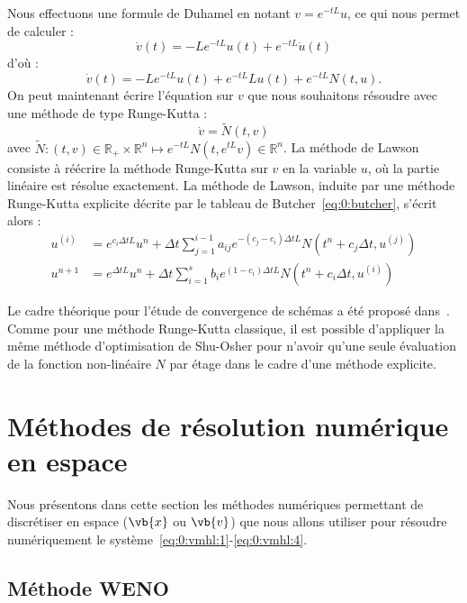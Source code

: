 Nous effectuons une formule de Duhamel en notant $v = e^{-tL}u$, ce qui nous permet de calculer :
$$
  \dot{v}(t) = -Le^{-tL}u(t) + e^{-tL}\dot{u}(t)
$$
d'où :
$$
  \dot{v}(t) = -Le^{-tL}u(t) + e^{-tL}Lu(t) + e^{-tL}N(t,u).
$$
On peut maintenant écrire l'équation sur $v$ que nous souhaitons résoudre avec une méthode de type Runge-Kutta :
$$
  \dot{v} = \tilde{N}(t,v)
$$
avec $\tilde{N}:(t,v)\in\mathbb{R}_+\times\mathbb{R}^n\mapsto e^{-tL}N(t,e^{tL}v)\in\mathbb{R}^n$. La méthode de Lawson consiste à réécrire la méthode Runge-Kutta sur $v$ en la variable $u$, où la partie linéaire est résolue exactement. La méthode de Lawson, induite par une méthode Runge-Kutta explicite décrite par le tableau de Butcher~\eqref{eq:0:butcher}, s'écrit alors :
$$
  \begin{aligned}
    u^{(i)} &= e^{c_i\Delta t L}u^n + \Delta t \sum_{j=1}^{i-1} a_{ij}e^{-(c_j-c_i)\Delta t L}N(t^n+c_j\Delta t,u^{(j)}) \\
    u^{n+1} &= e^{\Delta t L}u^n + \Delta t \sum_{i=1}^{s} b_i e^{(1-c_i)\Delta tL} N(t^n+c_i\Delta t,u^{(i)})
  \end{aligned}
$$

Le cadre théorique pour l'étude de convergence de schémas a été proposé dans~\cite{Hochbruck:2010,Hochbruck:2020}. Comme pour une méthode Runge-Kutta classique, il est possible d'appliquer la même méthode d'optimisation de Shu-Osher pour n'avoir qu'une seule évaluation de la fonction non-linéaire $N$ par étage dans le cadre d'une méthode explicite.


\section{Méthodes de résolution numérique en espace}

Nous présentons dans cette section les méthodes numériques permettant de discrétiser en espace ($\vb{x}$ ou $\vb{v}$) que nous allons utiliser pour résoudre numériquement le système~\eqref{eq:0:vmhl:1}-\eqref{eq:0:vmhl:4}.

\subsection{Méthode WENO}


